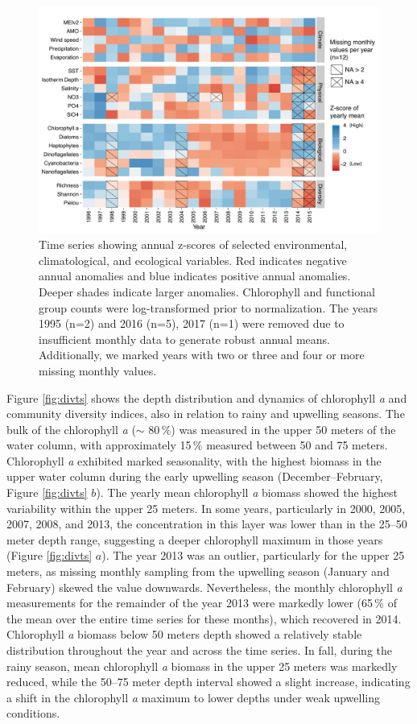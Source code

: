 \documentclass[draft]{agujournal2019}
\begin{document}
    
    \begin{figure}
    \noindent\includegraphics[width=\textwidth]{fig/Figure2_ZScores_v2.pdf}
    \caption{Time series showing annual z-scores of selected environmental, climatological, and ecological variables. Red indicates negative annual anomalies and blue indicates positive annual anomalies. Deeper shades indicate larger anomalies. Chlorophyll and functional group counts were log-transformed prior to normalization. The years 1995 (n=2) and 2016 (n=5), 2017 (n=1) were removed due to insufficient monthly data to generate robust annual means. Additionally, we marked years with two or three and four or more missing monthly values.}
    \label{fig:zscore}
    \end{figure}
    
    Figure \ref{fig:divts} shows the depth distribution and dynamics of chlorophyll \textit{a} and community diversity indices, also in relation to rainy and upwelling seasons. The bulk of the chlorophyll \textit{a} ($\sim$ 80\,\%) was measured in the upper 50 meters of the water column, with approximately 15\,\% measured between 50 and 75 meters. Chlorophyll \textit{a} exhibited marked seasonality, with the highest biomass in the upper water column during the early upwelling season (December–February, Figure \ref{fig:divts} $b$). The yearly mean chlorophyll \textit{a} biomass showed the highest variability within the upper 25 meters. In some years, particularly in 2000, 2005, 2007, 2008, and 2013, the concentration in this layer was lower than in the 25–50 meter depth range, suggesting a deeper chlorophyll maximum in those years (Figure \ref{fig:divts} $a$). The year 2013 was an outlier, particularly for the upper 25 meters, as missing monthly sampling from the upwelling season (January and February) skewed the value downwards. Nevertheless, the monthly chlorophyll \textit{a} measurements for the remainder of the year 2013 were markedly lower (65\,\% of the mean over the entire time series for these months), which recovered in 2014. Chlorophyll \textit{a} biomass below 50 meters depth showed a relatively stable distribution throughout the year and across the time series. In fall, during the rainy season, mean chlorophyll \textit{a} biomass in the upper 25 meters was markedly reduced, while the 50–75 meter depth interval showed a slight increase, indicating a shift in the chlorophyll \textit{a} maximum to lower depths under weak upwelling conditions.
    
\end{document}
